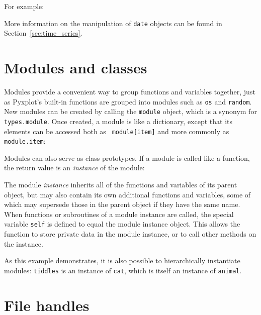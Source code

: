 For example:

\vspace{3mm}

\vspace{3mm}

More information on the manipulation of {\tt date} objects can be found in Section~\ref{sec:time_series}.

\section{Modules and classes}

Modules provide a convenient way to group functions and variables together,
just as Pyxplot's built-in functions are grouped into modules such as {\tt os}
and {\tt random}.  New modules can be created by calling the {\tt module}
object, which is a synonym for {\tt types.module}. Once created, a module is
like a dictionary, except that its elements can be accessed both as {\tt
module[item]} and more commonly as {\tt module.item}:

\vspace{3mm}

\vspace{3mm}

Modules can also serve as class prototypes. If a module is called like a
function, the return value is an {\it instance} of the module:

\vspace{3mm}

\vspace{3mm}

The module {\it instance} inherits all of the functions and variables of its
parent object, but may also contain its own additional functions and variables,
some of which may supersede those in the parent object if they have the same
name. When functions or subroutines of a module instance are called, the
special variable {\tt self} is defined to equal the module instance object.
This allows the function to store private data in the module instance, or to
call other methods on the instance.

\vspace{3mm}

\vspace{3mm}

As this example demonstrates, it is also possible to hierarchically instantiate
modules: {\tt tiddles} is an instance of {\tt cat}, which is itself an instance
of {\tt animal}.

\section{File handles}

